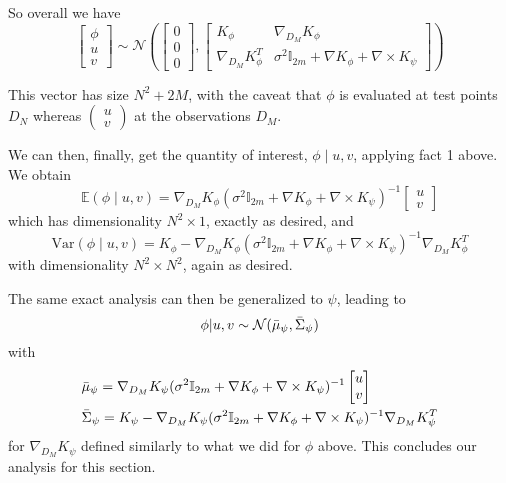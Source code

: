 \documentclass[11pt,a4paper]{article}
\newcommand{\icol}[1]{%
  \left(\begin{smallmatrix}#1\end{smallmatrix}\right)%
}
\begin{document}
So overall we have
$$
\begin{bmatrix}
\phi \\ u \\ v 
\end{bmatrix}
\sim \mathcal{N}\left( 
\begin{bmatrix}
0 \\ 0 \\ 0 
\end{bmatrix}, 
\begin{bmatrix}
K_{\phi} & \nabla_{D_M} K_{\phi} \\
\nabla_{D_M} K_{\phi}^T & \sigma^2 \mathbb{I}_{2m} + \nabla K_{\phi} + \nabla \times K_{\psi}
\end{bmatrix}
\right)
$$

This vector has size $N^2 + 2M$, with the caveat that $\phi$ is evaluated at test points $D_N$ whereas $\icol{u \\ v}$ at the observations $D_M$. \newline

We can then, finally, get the quantity of interest, $\phi \mid u,v$, applying fact 1 above. We obtain 
$$
\mathbb{E}(\phi \mid u, v) = \nabla_{D_M} K_{\phi} (\sigma^2 \mathbb{I}_{2m} + \nabla K_{\phi} + \nabla \times K_{\psi})^{-1} \begin{bmatrix}
u \\ v
\end{bmatrix}
$$
which has dimensionality $N^2 \times 1$, exactly as desired, and 
$$
\text{Var}(\phi \mid u, v) = K_{\phi} - \nabla_{D_M} K_{\phi} (\sigma^2 \mathbb{I}_{2m} + \nabla K_{\phi} + \nabla \times K_{\psi})^{-1} \nabla_{D_M} K_{\phi}^T
$$
with dimensionality $N^2 \times N^2$, again as desired. \newline

The same exact analysis can then be generalized to $\psi$, leading to 
$$
    \phi | u, v \sim \mathcal{N}(\Bar{\mu}_{\psi}, \Bar{\Sigma}_{\psi})
$$
with 
\begin{align*}
    &\Bar{\mu}_{\psi} = \nabla_{D_M} K_{\psi} (\sigma^2 \mathbb{I}_{2m} + \nabla K_{\phi} + \nabla \times K_{\psi})^{-1} 
    \begin{bmatrix}u \\ v \end{bmatrix} \\
    &\Bar{\Sigma}_{\psi} = K_{\psi} - \nabla_{D_M} K_{\psi} (\sigma^2 \mathbb{I}_{2m} + \nabla K_{\phi} + \nabla \times K_{\psi})^{-1} \nabla_{D_M} K_{\psi}^T
\end{align*}
for $\nabla_{D_M} K_{\psi}$ defined similarly to what we did for $\phi$ above. This concludes our analysis for this section. \newline
\end{document}
